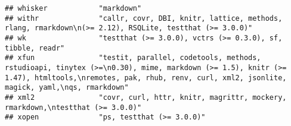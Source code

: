 \documentclass[
]{article}
\begin{document}
\begin{verbatim}
## whisker            "markdown"                                                                                                                                                                                                                                                                                                                                                                                                                                                                        
## withr              "callr, covr, DBI, knitr, lattice, methods, rlang, rmarkdown\n(>= 2.12), RSQLite, testthat (>= 3.0.0)"                                                                                                                                                                                                                                                                                                                                                                            
## wk                 "testthat (>= 3.0.0), vctrs (>= 0.3.0), sf, tibble, readr"                                                                                                                                                                                                                                                                                                                                                                                                                        
## xfun               "testit, parallel, codetools, methods, rstudioapi, tinytex (>=\n0.30), mime, markdown (>= 1.5), knitr (>= 1.47), htmltools,\nremotes, pak, rhub, renv, curl, xml2, jsonlite, magick, yaml,\nqs, rmarkdown"                                                                                                                                                                                                                                                                        
## xml2               "covr, curl, httr, knitr, magrittr, mockery, rmarkdown,\ntestthat (>= 3.0.0)"                                                                                                                                                                                                                                                                                                                                                                                                     
## xopen              "ps, testthat (>= 3.0.0)"                                                                                                                                                                                                                                                                                                                                                                                                                                                         

\end{verbatim}
\end{document}

